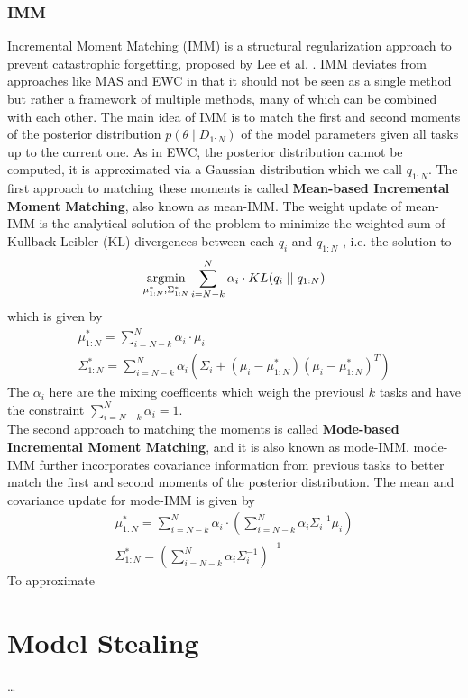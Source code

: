 \subsubsection{IMM}
Incremental Moment Matching (IMM) is a structural regularization approach to prevent catastrophic forgetting, proposed by Lee et al. \cite{lee2017overcoming}.
IMM deviates from approaches like MAS and EWC in that it should not be seen as a single method but rather a framework of multiple methods, many of which can be
combined with each other. The main idea of IMM is to match the first and second moments of the posterior distribution $p(\theta \mid D_{1:N})$ of the model 
parameters given all tasks up to the current one. As in EWC, the posterior distribution cannot be computed, it is approximated via a Gaussian distribution which
we call $q_{1:N}$. The first approach to matching these moments is called \textbf{Mean-based Incremental Moment Matching}, also known as mean-IMM. The weight
update of mean-IMM is the analytical solution of the problem to minimize the weighted sum of Kullback-Leibler (KL) divergences between each $q_i$ and $q_{1:N}$
\cite{goldberger2004hierarchical}, i.e. the solution to
\begin{equation}
    \operatorname*{\arg\!\min}_{\mu^*_{1:N},\Sigma^*_{1:N}} \sum_{i=N-k}^N \alpha_i \cdot KL(q_i \mid \mid q_{1:N})
\end{equation}
which is given by
\begin{gather}
    \mu^*_{1:N} = \sum_{i=N-k}^N \alpha_i \cdot \mu_i \\
    \Sigma^*_{1:N} = \sum_{i=N-k}^N \alpha_i (\Sigma_i + (\mu_i - \mu^*_{1:N})(\mu_i - \mu^*_{1:N})^T)
\end{gather}
The $\alpha_i$ here are the mixing coefficents which weigh the previousl $k$ tasks and have the constraint $\sum_{i=N-k}^N \alpha_i = 1$.  \\
The second approach to matching the moments is called \textbf{Mode-based Incremental Moment Matching}, and it is also known as mode-IMM. mode-IMM
further incorporates covariance information from previous tasks to better match the first and second moments of the posterior distribution. 
The mean and covariance update for mode-IMM is given by
\begin{gather}
    \mu^*_{1:N} = \sum_{i=N-k}^N \alpha_i \cdot (\sum_{i=N-k}^N \alpha_i \Sigma_i^{-1} \mu_i) \\
    \Sigma^*_{1:N} = (\sum_{i=N-k}^N \alpha_i  \Sigma_i^{-1})^{-1}
\end{gather}
To approximate 


\section{Model Stealing}
\label{sec:Related_work:Model_Stealing}

\dots
